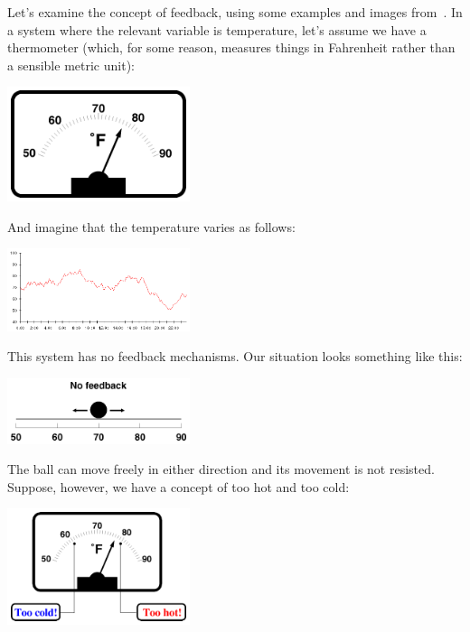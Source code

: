 Let's examine the concept of feedback, using some examples and images from~\cite{hackerdiet}. In a system where the relevant variable is temperature, let's assume we have a thermometer (which, for some reason, measures things in Fahrenheit rather than a sensible metric unit):
\begin{center}
	\includegraphics[width=0.4\textwidth]{images/thermometer.png}
\end{center}

And imagine that the temperature varies as follows:

\begin{center}
	\includegraphics[width=0.4\textwidth]{images/temperature-chart.png}
\end{center}

This system has no feedback mechanisms. Our situation looks something like this:
\begin{center}
	\includegraphics[width=0.4\textwidth]{images/nofeedback.png}
\end{center}

The ball can move freely in either direction and its movement is not resisted. Suppose, however, we have a concept of too hot and too cold:
\begin{center}
	\includegraphics[width=0.4\textwidth]{images/temperature-hotcold.png}
\end{center}

